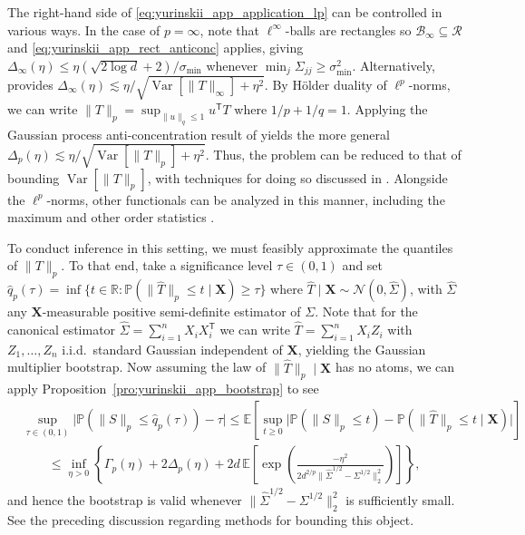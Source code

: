 \documentclass[11pt,lof]{puthesis}
\renewcommand{\P}{\ensuremath{\mathbb{P}}}
\newcommand{\R}{\ensuremath{\mathbb{R}}}
\newcommand{\E}{\ensuremath{\mathbb{E}}}
\newcommand{\bX}{\ensuremath{\mathbf{X}}}
\newcommand{\cN}{\ensuremath{\mathcal{N}}}
\newcommand{\cB}{\ensuremath{\mathcal{B}}}
\newcommand{\cR}{\ensuremath{\mathcal{R}}}
\newcommand{\T}{\ensuremath{\mathsf{T}}}
\DeclareMathOperator{\Var}{Var}
\theoremstyle{break}
\theoremstyle{proof}
\begin{document}
The right-hand side of
\eqref{eq:yurinskii_app_application_lp} can be controlled in various ways.
%
In the case of $p=\infty$,
note that $\ell^\infty$-balls are rectangles so
$\cB_\infty\subseteq \cR$
and \eqref{eq:yurinskii_app_rect_anticonc} applies, giving
$\Delta_\infty(\eta) \leq \eta (\sqrt{2\log d} + 2) / \sigma_{\min}$
whenever $\min_j \Sigma_{j j} \geq \sigma_{\min}^2$.
Alternatively, \citet[Theorem~1]{giessing2023anti} provides
$\Delta_\infty(\eta) \lesssim \eta / \sqrt{\Var[\|T\|_\infty] + \eta^2}$.
By H{\"o}lder duality of $\ell^p$-norms, we can write
$\|T\|_p = \sup_{\|u\|_q \leq 1} u^\T T$ where $1/p + 1/q = 1$.
Applying the Gaussian process anti-concentration result of
\citet[Theorem~2]{giessing2023anti} yields the more general
$\Delta_p(\eta) \lesssim \eta / \sqrt{\Var[\|T\|_p] + \eta^2}$.
Thus, the problem can be reduced to that of bounding
$\Var\left[\|T\|_p\right]$, with techniques for doing so
discussed in \citet[Section~4]{giessing2023anti}.
Alongside the $\ell^p$-norms, other functionals can be analyzed in this manner,
including the maximum and other order statistics
\citep{kozbur2021dimension,giessing2023anti}.

To conduct inference in this setting, we must feasibly
approximate the quantiles of $\|T\|_p$.
To that end, take a significance level $\tau\in(0,1)$ and set
%
$\hat q_p(\tau) =
\inf \big\{t \in \R: \P(\|\hat T\|_p \leq t \mid \bX) \geq \tau \}$
where $\hat T \mid \bX \sim \cN(0, \hat\Sigma)$,
%
with $\hat\Sigma$ any $\bX$-measurable positive semi-definite
estimator of $\Sigma$.
Note that for the canonical estimator $\hat\Sigma = \sum_{i=1}^n X_i X_i^\T$
we can write $\hat T =\sum_{i=1}^n X_i Z_i$ with
$Z_1,\dots,Z_n$ i.i.d.\ standard Gaussian independent of $\bX$,
yielding the Gaussian multiplier bootstrap.
Now assuming
the law of $\|\hat T\|_p \mid \bX$ has no atoms,
we can apply Proposition~\ref{pro:yurinskii_app_bootstrap}
to see
%
\begin{align*}
  &\sup_{\tau\in(0,1)}
  \big|\P\left(\|S\|_p \leq \hat q_p(\tau)\right) - \tau \big|
  \leq
  \E\left[
    \sup_{t \geq 0}
    \big|
    \P(\|S\|_p \leq t)
    - \P(\|\hat T\|_p \leq t \mid \bX)
    \big|
  \right] \\
  &\qquad\leq
  \inf_{\eta>0}
  \left\{ \Gamma_p(\eta)
    + 2 \Delta_p(\eta)
    + 2d\, \E\left[
      \exp\left(\frac{-\eta^2}
      {2d^{2/p}\big\|\hat \Sigma^{1/2} - \Sigma^{1/2}\big\|_2^2}\right)
    \right]
  \right\},
\end{align*}
%
and hence the bootstrap is valid whenever
$\|\hat \Sigma^{1/2} - \Sigma^{1/2}\big\|_2^2$ is sufficiently small. See the
preceding discussion regarding methods for bounding this object.
\end{document}
